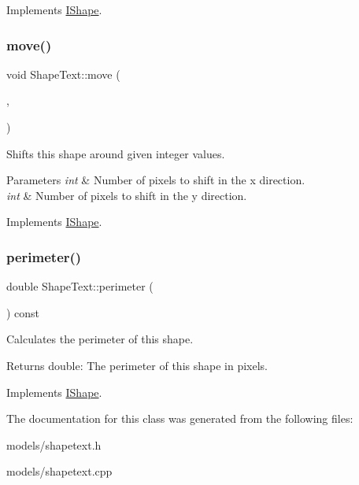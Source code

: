 Implements \mbox{\hyperlink{class_i_shape_ad97c626e7e2c9afb9f51efc41b836e6f}{I\+Shape}}.

\mbox{\label{class_shape_text_ae7b73f317077c9873f4bd59c98b89c60}} 
\subsubsection{\texorpdfstring{move()}{move()}}
{\footnotesize\ttfamily void Shape\+Text\+::move (\begin{DoxyParamCaption}\item[{int}]{,  }\item[{int}]{ }\end{DoxyParamCaption})\hspace{0.3cm}{\ttfamily [virtual]}}



Shifts this shape around given integer values. 


\begin{DoxyParams}{Parameters}
{\em int} & Number of pixels to shift in the x direction. \\
\hline
{\em int} & Number of pixels to shift in the y direction. \\
\hline
\end{DoxyParams}


Implements \mbox{\hyperlink{class_i_shape_a3d23494cd34e658cc6b39a2e2db0b7fe}{I\+Shape}}.

\mbox{\label{class_shape_text_a01a24fe247554c614f98756f964ca0f8}} 
\subsubsection{\texorpdfstring{perimeter()}{perimeter()}}
{\footnotesize\ttfamily double Shape\+Text\+::perimeter (\begin{DoxyParamCaption}{ }\end{DoxyParamCaption}) const\hspace{0.3cm}{\ttfamily [virtual]}}



Calculates the perimeter of this shape. 

\begin{DoxyReturn}{Returns}
double\+: The perimeter of this shape in pixels. 
\end{DoxyReturn}


Implements \mbox{\hyperlink{class_i_shape_a485f6770c4e56b31c76d368b959b6f00}{I\+Shape}}.



The documentation for this class was generated from the following files\+:\begin{DoxyCompactItemize}
\item 
models/shapetext.\+h\item 
models/shapetext.\+cpp\end{DoxyCompactItemize}
